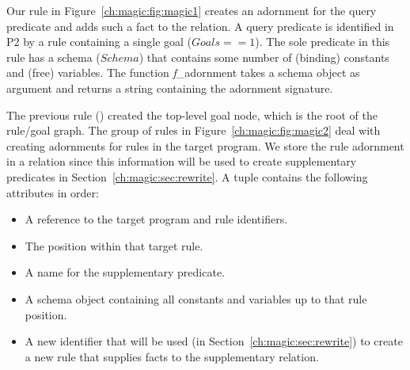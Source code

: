 Our rule in Figure~\ref{ch:magic:fig:magic1} creates an adornment for the query
predicate and adds such a fact to the  relation.  A query
predicate is identified in P2 by a rule containing a single goal ($Goals ==
1$).  The sole predicate in this rule has a schema ($Schema$) that contains
some number of (binding) constants and (free) variables.  The function {\emph
f\_adornment} takes a schema object as argument and returns a string containing
the adornment signature.

The previous rule () created the top-level goal node, which is the root
of the rule/goal graph.  The group of rules in Figure~\ref{ch:magic:fig:magic2}
deal with creating adornments for rules in the target program.  We store the
rule adornment in a  relation since this information will be used to
create supplementary predicates in Section~\ref{ch:magic:sec:rewrite}.  A
 tuple contains the following attributes in order:
\begin{itemize}
   \ssp
  \item A reference to the target program and rule identifiers. 
  \item The position within that target rule.
  \item A name for the supplementary predicate.
  \item A schema object containing all constants and variables up to that rule position.
  \item A new identifier that will be used (in Section~\ref{ch:magic:sec:rewrite}) to create 
    a new rule that supplies facts to the supplementary relation.
\end{itemize}

